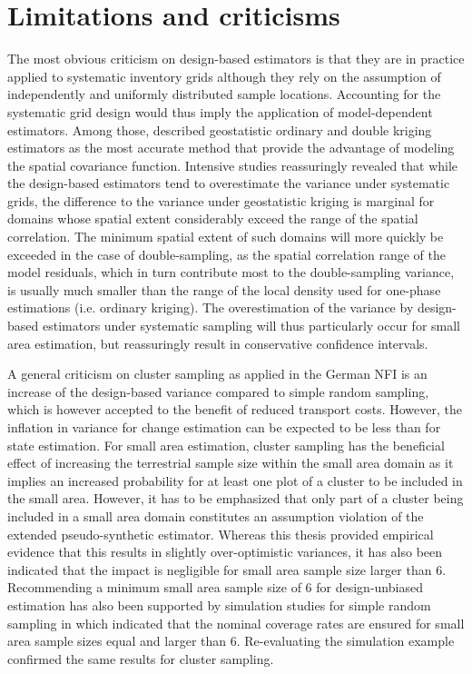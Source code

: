 
\section{Limitations and criticisms}
\label{sec:synth:limits}

The most obvious criticism on design-based estimators is that they are in practice applied to systematic inventory grids although they rely on the assumption of independently and uniformly distributed sample locations. Accounting for the systematic grid design would thus imply the application of model-dependent estimators. Among those, \citet{mandallaz1993} described geostatistic ordinary and double kriging estimators as the most accurate method that provide the advantage of modeling the spatial covariance function. Intensive studies reassuringly revealed that while the design-based estimators tend to overestimate the variance under systematic grids, the difference to the variance under geostatistic kriging is marginal for domains whose spatial extent considerably exceed the range of the spatial correlation. The minimum spatial extent of such domains will more quickly be exceeded in the case of double-sampling, as the spatial correlation range of the model residuals, which in turn contribute most to the double-sampling variance, is usually much smaller than the range of the local density used for one-phase estimations (i.e. ordinary kriging). The overestimation of the variance by design-based estimators under systematic sampling will thus particularly occur for small area estimation, but reassuringly result in conservative confidence intervals.\par

A general criticism on cluster sampling as applied in the German NFI is an increase of the design-based variance compared to simple random sampling, which is however accepted to the benefit of reduced transport costs. However, the inflation in variance for change estimation can be expected to be less than for state estimation. For small area estimation, cluster sampling has the beneficial effect of increasing the terrestrial sample size within the small area domain as it implies an increased probability for at least one plot of a cluster to be included in the small area. However, it has to be emphasized that only part of a cluster being included in a small area domain constitutes an assumption violation of the extended pseudo-synthetic estimator. Whereas this thesis provided empirical evidence that this results in slightly over-optimistic variances, it has also been indicated that the impact is negligible for small area sample size larger than 6. Recommending a minimum small area sample size of 6 for design-unbiased estimation has also been supported by simulation studies for simple random sampling in \citet{mandallaz2013b} which indicated that the nominal coverage rates are ensured for small area sample sizes equal and larger than 6. Re-evaluating the simulation example confirmed the same results for cluster sampling.\par 

